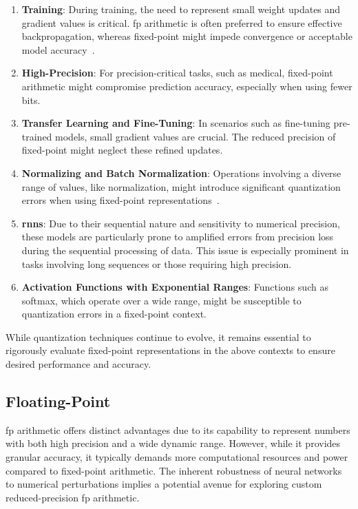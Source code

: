 \begin{enumerate}
	\item \textbf{Training}: During training, the need to represent small weight updates and gradient values is critical. \gls{fp} arithmetic is often preferred to ensure effective backpropagation, whereas fixed-point might impede convergence or acceptable model accuracy~\cite{courbariaux2014training}.
	
	\item \textbf{High-Precision}: For precision-critical tasks, such as medical, fixed-point arithmetic might compromise prediction accuracy, especially when using fewer bits.
	
	\item \textbf{Transfer Learning and Fine-Tuning}: In scenarios such as fine-tuning pre-trained models, small gradient values are crucial. The reduced precision of fixed-point might neglect these refined updates.
	
	\item \textbf{Normalizing and Batch Normalization}: Operations involving a diverse range of values, like normalization, might introduce significant quantization errors when using fixed-point representations~\cite{jacob2018quantization}.
	
	\item \textbf{\glspl{rnn}}: Due to their sequential nature and sensitivity to numerical precision, these models are particularly prone to amplified errors from precision loss during the sequential processing of data. This issue is especially prominent in tasks involving long sequences or those requiring high precision.
	
	\item \textbf{Activation Functions with Exponential Ranges}: Functions such as softmax, which operate over a wide range, might be susceptible to quantization errors in a fixed-point context.
\end{enumerate}

While quantization techniques continue to evolve, it remains essential to rigorously evaluate fixed-point representations in the above contexts to ensure desired performance and accuracy.



\subsection{Floating-Point}
\gls{fp} arithmetic offers distinct advantages due to its capability to represent numbers with both high precision and a wide dynamic range. However, while it provides granular accuracy, it typically demands more computational resources and power compared to fixed-point arithmetic. The inherent robustness of neural networks to numerical perturbations implies a potential avenue for exploring custom reduced-precision \gls{fp} arithmetic.

